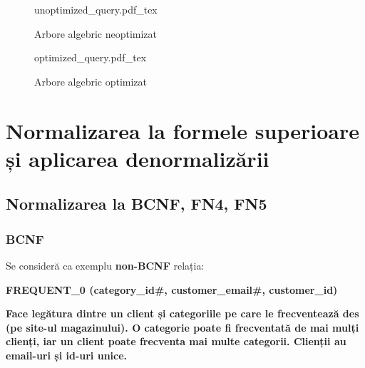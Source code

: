 \documentclass[a4paper, oneside, 12pt]{article}
\newcommand{\incfig}[1]{%
    \def\svgwidth{\columnwidth}
    {#1.pdf_tex}
}
\begin{document}
\begin{center}

\minipage{\linewidth}

\endminipage

\end{center}

\begin{center}

\minipage{\linewidth}

\endminipage

\end{center}

\begin{figure}[H]
    \centering
    \incfig{unoptimized_query}
    \caption{Arbore algebric neoptimizat}
\end{figure}

\begin{figure}[H]
    \centering
    \incfig{optimized_query}
    \caption{Arbore algebric optimizat}
\end{figure}

\section{Normalizarea la formele superioare și aplicarea denormalizării}

\subsection{Normalizarea la \textbf{BCNF}, \textbf{FN4}, \textbf{FN5}}

\subsubsection{\textbf{BCNF}}

Se consideră ca exemplu \textbf{non-BCNF} relația:

\begin{m_itemize}
        \item \textbf{FREQUENT\_0 (category\_id\#, customer\_email\#, customer\_id)}
        \item \textbf{Face legătura dintre un client și categoriile pe care le
              frecventează des (pe site-ul magazinului).  O categorie poate
              fi frecventată de mai mulți clienți, iar un client poate frecventa mai
              multe categorii. Clienții au email-uri și id-uri unice.}
\end{m_itemize}
\end{document}

